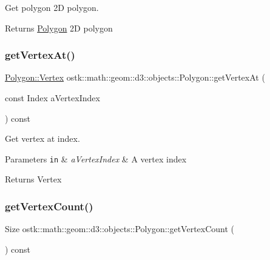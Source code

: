 Get polygon 2D polygon. 

\begin{DoxyReturn}{Returns}
\hyperlink{classostk_1_1math_1_1geom_1_1d3_1_1objects_1_1_polygon}{Polygon} 2D polygon 
\end{DoxyReturn}
\mbox{\label{classostk_1_1math_1_1geom_1_1d3_1_1objects_1_1_polygon_aa1d4c9b5847683b43e17711b4e2b3292}} 
\subsubsection{\texorpdfstring{get\+Vertex\+At()}{getVertexAt()}}
{\footnotesize\ttfamily \hyperlink{classostk_1_1math_1_1geom_1_1d3_1_1objects_1_1_polygon_a314eaf277355d59f5e6ab775702c47c2}{Polygon\+::\+Vertex} ostk\+::math\+::geom\+::d3\+::objects\+::\+Polygon\+::get\+Vertex\+At (\begin{DoxyParamCaption}\item[{const Index}]{a\+Vertex\+Index }\end{DoxyParamCaption}) const}



Get vertex at index. 


\begin{DoxyParams}[1]{Parameters}
\mbox{\tt in}  & {\em a\+Vertex\+Index} & A vertex index \\
\hline
\end{DoxyParams}
\begin{DoxyReturn}{Returns}
Vertex 
\end{DoxyReturn}
\mbox{\label{classostk_1_1math_1_1geom_1_1d3_1_1objects_1_1_polygon_a5315dde32e364e81546c8bc4b62a9996}} 
\subsubsection{\texorpdfstring{get\+Vertex\+Count()}{getVertexCount()}}
{\footnotesize\ttfamily Size ostk\+::math\+::geom\+::d3\+::objects\+::\+Polygon\+::get\+Vertex\+Count (\begin{DoxyParamCaption}{ }\end{DoxyParamCaption}) const}



